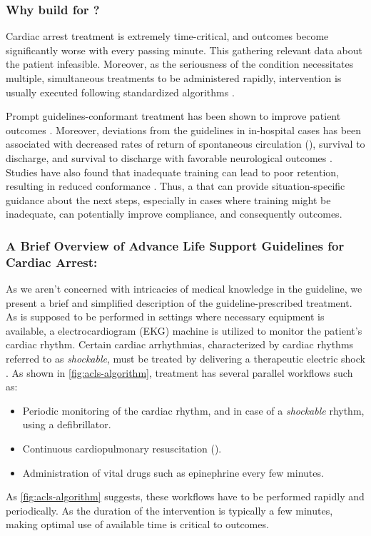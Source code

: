 \subsubsection{Why build \CDSSs{} for \ACLS{}?}

Cardiac arrest treatment is extremely time-critical, and outcomes
become significantly worse with every passing minute. This
gathering relevant data about the patient infeasible. Moreover, as
the seriousness of the condition necessitates multiple, simultaneous treatments
to be administered rapidly, intervention is usually executed following
standardized \ACLS{} algorithms \cite{ACLSWikiEntry}.

Prompt \ACLS{} guidelines-conformant treatment has been
shown to improve patient outcomes \cite{HonarmandResuscitation18}.
Moreover, deviations from the guidelines in in-hospital cases has been
associated with decreased rates of return of spontaneous circulation (\ROSC{}),
survival to discharge, and survival to discharge with favorable neurological
outcomes \cite{CrowleyResuscitation20}. Studies have also found that
inadequate \ACLS{} training can lead to poor retention, resulting
in reduced \ACLS{} conformance \cite{KiddJCN07}. Thus,
a \CDSS{} that can provide situation-specific guidance about
the next steps, especially in cases where \HCP{} training might be inadequate,
can potentially improve compliance, and consequently outcomes.

\subsubsection{A Brief Overview of Advance Life Support Guidelines for Cardiac Arrest:}

As we aren't concerned with intricacies of medical knowledge in the guideline,
we present a brief and simplified description of the guideline-prescribed treatment.
As \ALS{} is supposed to be performed in settings where necessary equipment is
available, a electrocardiogram (EKG) machine is utilized to
monitor the patient's cardiac rhythm. Certain cardiac arrhythmias, characterized
by cardiac rhythms referred to as \emph{shockable}, must be treated
by delivering a therapeutic electric shock
\cite{DefibrillationWikiEntry}. As shown in \autoref{fig:acls-algorithm},
treatment has several parallel workflows such as:
\begin{itemize}
  \item Periodic monitoring of the cardiac rhythm, and in case of a
    \emph{shockable} rhythm, using a defibrillator.
  \item Continuous cardiopulmonary resuscitation (\CPR{}).
  \item Administration of vital drugs such as
    epinephrine every few minutes.
\end{itemize}
As \autoref{fig:acls-algorithm} suggests, these workflows have to be
performed rapidly and periodically. As the duration of the intervention
is typically a few minutes, making optimal use of available time is critical to
outcomes.

